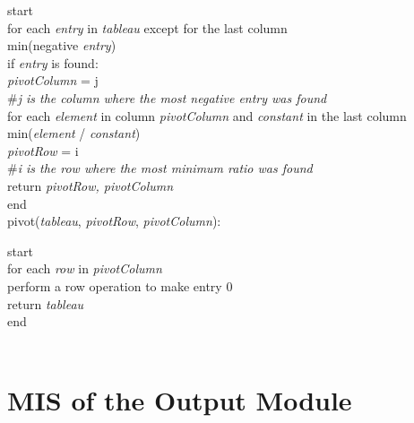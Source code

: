 \documentclass[12pt, titlepage]{article}
\begin{document}
\hspace*{0.3cm} start \\
\hspace*{2cm} for each \textit{entry} in \textit{tableau} except for the last 
column \\
\hspace*{3cm} min(negative \textit{entry}) \\
\hspace*{3cm} if \textit{entry} is found: \\
\hspace*{4cm} \textit{pivotColumn} = j \\
\hspace*{4cm} \textcolor{pyComment}{\#\textit{j is the column where the most 
negative entry was found}} \\
\hspace*{2cm} for each \textit{element} in column \textit{pivotColumn} and 
\textit{constant} in the last column\\
\hspace*{3cm} min(\textit{element} / \textit{constant}) \\
\hspace*{3cm} \textit{pivotRow} = i \\
\hspace*{3cm} \textcolor{pyComment}{\#\textit{i is the row where the most 
minimum ratio was found}} \\
\hspace*{2cm} return \textit{pivotRow, pivotColumn} \\
\hspace*{0.9cm} end \\

\noindent 
pivot(\textit{tableau}, \textit{pivotRow}, \textit{pivotColumn}):

\hspace*{0.3cm} start \\
\hspace*{2cm} for each \textit{row} in \textit{pivotColumn} \\
\hspace*{3cm} perform a row operation to make entry 0 \\
\hspace*{2cm} return \textit{tableau} \\
\hspace*{0.9cm} end \\

~\newpage

\section{MIS of the Output Module} \label{M} 
\end{document}

